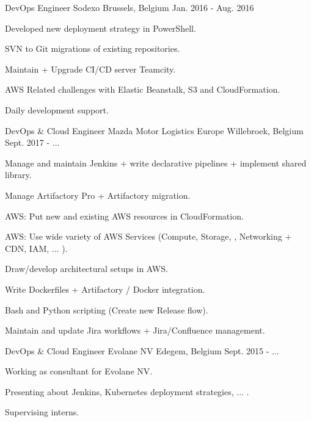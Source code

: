 \begin{cventries}
  \cventry
    {DevOps Engineer} %
    {Sodexo} %
    {Brussels, Belgium} %
    {Jan. 2016 - Aug. 2016} %
    {
      \begin{cvitems} %
        \item {Developed new deployment strategy in PowerShell.}
        \item {SVN to Git migrations of existing repositories.}
        \item {Maintain + Upgrade CI/CD server Teamcity.}
        \item {AWS Related challenges with Elastic Beanstalk, S3 and CloudFormation.}
        \item {Daily development support.}
      \end{cvitems}
    }

  \cventry
    {DevOps \& Cloud Engineer} %
    {Mazda Motor Logistics Europe} %
    {Willebroek, Belgium} %
    {Sept. 2017 - ...} %
    {
      \begin{cvitems} %
        \item {Manage and maintain Jenkins + write declarative pipelines + implement shared library.}
        \item {Manage Artifactory Pro + Artifactory migration.}
        \item {AWS: Put new and existing AWS resources in CloudFormation.}
        \item {AWS: Use wide variety of AWS Services (Compute, Storage, , Networking + CDN, IAM, ... ). }
        \item {Draw/develop architectural setups in AWS.}
        \item {Write Dockerfiles + Artifactory / Docker integration.}
        \item {Bash and Python scripting (Create new Release flow).}
        \item {Maintain and update Jira workflows + Jira/Confluence management.}
      \end{cvitems}
    }

  \cventry
    {DevOps \& Cloud Engineer} %
    {Evolane NV} %
    {Edegem, Belgium} %
    {Sept. 2015 - ...} %
    {
      \begin{cvitems} %
        \item {Working as consultant for Evolane NV.}
        \item {Presenting about Jenkins, Kubernetes deployment strategies, ... .}
        \item {Supervising interns.}
      \end{cvitems}
    }

\end{cventries}
